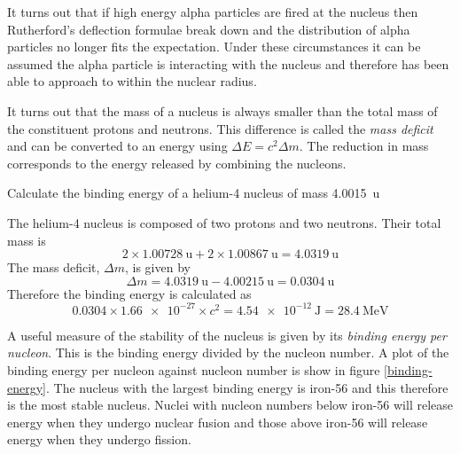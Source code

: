 \documentclass[main.tex]{subfiles}
\begin{document}
It turns out that if high energy alpha particles are fired at the nucleus then Rutherford's deflection formulae break down and the distribution of alpha particles no longer fits the expectation. Under these circumstances it can be assumed the alpha particle is interacting with the nucleus and therefore has been able to approach to within the nuclear radius.

\newpage
{}

It turns out that the mass of a nucleus is always smaller than the total mass of the constituent protons and neutrons. This difference is called the \emph{mass deficit} and can be converted to an energy using $ \Delta E = c^2 \Delta m$. The reduction in mass corresponds to the energy released by combining the nucleons.

\begin{example}
  Calculate the binding energy of a helium-4 nucleus of mass \SI{4.0015}{\amu}

  \answer

  The helium-4 nucleus is composed of two protons and two neutrons. Their total mass is
  \[ 2\times \SI{1.00728}{\amu}+2\times \SI{1.00867}{\amu} = \SI{4.0319}{\amu} \]
  The mass deficit, $\Delta m$, is given by
  \[ \Delta m = \SI{4.0319}{\amu} - \SI{4.00215}{\amu} = \SI{0.0304}{\amu} \]
  Therefore the binding energy is calculated as
  \[ \num{0.0304} \times \num{1.66e-27} \times c^2 = \SI{4.54e-12}{\joule} = \SI{28.4}{\mega\electronvolt} \]
\end{example}

\newpage
{}

A useful measure of the stability of the nucleus is given by its \emph{binding energy per nucleon}. This is the binding energy divided by the nucleon number. A plot of the binding energy per nucleon against nucleon number is show in figure \ref{binding-energy}.  The nucleus with the largest binding energy is iron-56 and this therefore is the most stable nucleus. Nuclei with nucleon numbers below iron-56 will release energy when they undergo nuclear fusion and those above iron-56 will release energy when they undergo fission.
\end{document}
